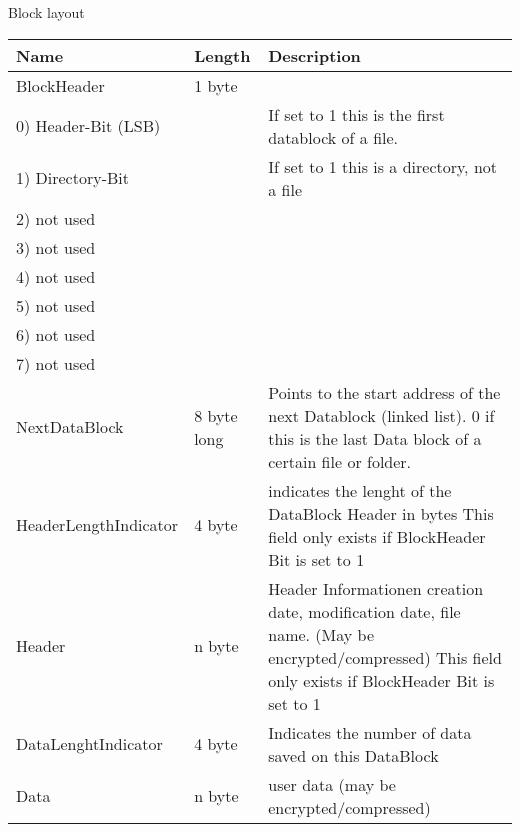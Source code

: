 Block layout \\

\begin{tabular}{|l|l|p{5cm}|}
\hline
  \textbf{Name} & \textbf{Length} & \textbf{Description}
\\  \hline
 BlockHeader & 1 byte &
 \\
 \hspace{0.2cm} 0) Header-Bit (LSB) & &  If set to 1 this is the first datablock
 of a file.
 \\ 
 \hspace{0.2cm} 1) Directory-Bit & &  If set to 1 this is a directory, not a file
 \\ 
 \hspace{0.2cm} 2) not used & &  
 \\ 
 \hspace{0.2cm} 3) not used & &  
 \\ 
 \hspace{0.2cm} 4) not used & &  
 \\ 
 \hspace{0.2cm} 5) not used & &  
 \\ 
 \hspace{0.2cm} 6) not used & &  
 \\ 
 \hspace{0.2cm} 7) not used & &  
 
\\  \hline
 NextDataBlock & 8 byte long & 
 Points to the start address of the next Datablock (linked list).
    0 if this is the last Data block of a certain file or folder.
\\  \hline
  HeaderLengthIndicator & 4 byte &     indicates the lenght of the DataBlock Header in bytes
  \newline This field only exists if BlockHeader Bit is set to 1
\\  \hline
  Header & 
  n byte &
  Header Informationen creation date, modification date, file name. (May be encrypted/compressed)
  \newline This field only exists if BlockHeader Bit is set to 1
\\  \hline
  DataLenghtIndicator & 4 byte &
    Indicates the number of data saved on this DataBlock
\\  \hline
 Data & n byte & user data (may be encrypted/compressed)
\\  \hline
\end{tabular}